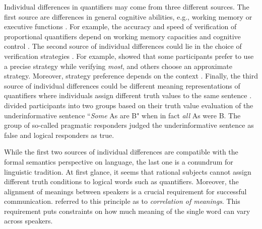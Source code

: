 \documentclass{article}
\begin{document}
Individual differences in quantifiers may come from three different sources. The first source are differences in general cognitive abilities, e.g., working memory \cite{Just1992AMemory, Kidd2018} or executive functions \cite{Kidd2018}. For example, the accuracy and speed of verification of proportional quantifiers depend on working memory capacities \cite{Steinert-Threlkeld2015, Zajenkowski2013MOSTPerspective, Zajenkowski2014WorkingVerification} and cognitive control \cite{Zajenkowski2013MOSTPerspective, Zajenkowski2014WorkingVerification}. The second source of individual differences could lie in the choice of verification strategies \cite{Talmina2017}. For example,  showed that some participants prefer to use a precise strategy while verifying \textit{most}, and others choose an approximate strategy. Moreover, strategy preference depends on the context \cite{Register2018SemanticContext}. Finally, the third source of individual differences could be different meaning representations of quantifiers where individuals assign different truth values to the same sentence \cite{Spychalska2016InvestigatingPotentials}.  divided participants into two groups based on their truth value evaluation of the underinformative sentence ``\textit{Some} As are B" when in fact \textit{all} As were B. The group of so-called pragmatic responders judged the underinformative sentence as false and logical responders as true. 

While the first two sources of individual differences are compatible with the formal semantics perspective on language, the last one is a conundrum for linguistic tradition. At first glance, it seems that rational subjects cannot assign different truth conditions to logical words such as quantifiers. Moreover, the alignment of meanings between speakers is a crucial requirement for successful communication.  referred to this principle as to \textit{correlation of meanings}. This requirement puts constraints on how much meaning of the single word can vary across speakers. 
\end{document}
